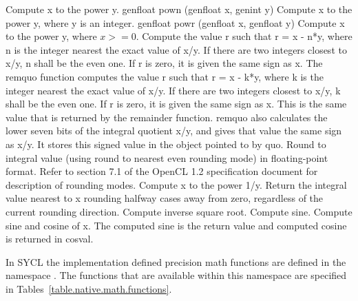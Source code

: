 {
 Compute x to the power y.
}
\addRow
{
genfloat pown (genfloat x, genint y)
}
{
Compute x to the power y, where y is an integer.
}
\addRow
{
genfloat powr (genfloat x, genfloat y)
}
{
Compute x to the power y, where $ x > = 0 $.
}
{
Compute the value r such that r = x - n*y, where n
is the integer nearest the exact value of x/y. If there
are two integers closest to x/y, n shall be the even
one. If r is zero, it is given the same sign as x.
}
{
The remquo function computes the value r such
that r = x - k*y, where k is the integer nearest the
exact value of x/y. If there are two integers closest
to x/y, k shall be the even one. If r is zero, it is
given the same sign as x. This is the same value
that is returned by the remainder function.
remquo also calculates the lower seven bits of the
integral quotient x/y, and gives that value the same
sign as x/y. It stores this signed value in the object
pointed to by quo.
}
{
Round to integral value (using round to nearest
even rounding mode) in floating-point format.
Refer to section 7.1 of the OpenCL 1.2 specification
document\cite{opencl12} for description of rounding
modes.
}
{
Compute x to the power 1/y.
}
{
 Return the integral value nearest to x rounding
halfway cases away from zero, regardless of the
current rounding direction.
}
{
Compute inverse square root.
}
{
 Compute sine.
}
{
Compute sine and cosine of x. The computed sine
is the return value and computed cosine is returned
in cosval.
}
\completeTable

In SYCL the implementation defined precision math functions  are defined in the
namespace . The functions that are available within
this namespace are specified in Tables~\ref{table.native.math.functions}.


